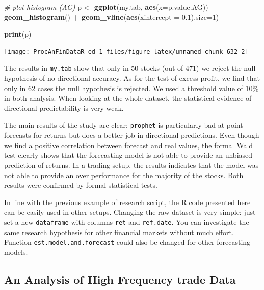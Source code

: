 \documentclass[11pt,]{book}
\newenvironment{Shaded}{\begin{snugshade}}{\end{snugshade}}
\newcommand{\KeywordTok}[1]{\textcolor[rgb]{0.27,0.27,0.27}{\textbf{#1}}}
\newcommand{\DataTypeTok}[1]{\textcolor[rgb]{0.27,0.27,0.27}{#1}}
\newcommand{\DecValTok}[1]{\textcolor[rgb]{0.06,0.06,0.06}{#1}}
\newcommand{\FloatTok}[1]{\textcolor[rgb]{0.06,0.06,0.06}{#1}}
\newcommand{\StringTok}[1]{\textcolor[rgb]{0.5,0.5,0.5}{#1}}
\newcommand{\CommentTok}[1]{\textcolor[rgb]{0.56,0.35,0.01}{\textit{#1}}}
\newcommand{\OperatorTok}[1]{\textcolor[rgb]{0.81,0.36,0.00}{\textbf{#1}}}
\newcommand{\NormalTok}[1]{#1}
\begin{document}
\begin{Shaded}
\begin{Highlighting}[]
\CommentTok{# plot histogram (AG)}
\NormalTok{p <-}\StringTok{ }\KeywordTok{ggplot}\NormalTok{(my.tab, }\KeywordTok{aes}\NormalTok{(}\DataTypeTok{x=}\NormalTok{p.value.AG)) }\OperatorTok{+}\StringTok{ }
\StringTok{    }\KeywordTok{geom_histogram}\NormalTok{() }\OperatorTok{+}\StringTok{ }
\StringTok{    }\KeywordTok{geom_vline}\NormalTok{(}\KeywordTok{aes}\NormalTok{(}\DataTypeTok{xintercept =}  \FloatTok{0.1}\NormalTok{),}\DataTypeTok{size=}\DecValTok{1}\NormalTok{)}

\KeywordTok{print}\NormalTok{(p)    }
\end{Highlighting}
\end{Shaded}

\begin{center}\texttt{[image: ProcAnFinDataR\_ed\_1\_files/figure-latex/unnamed-chunk-632-2]} \end{center}

The results in \texttt{my.tab} show that only in 50 stocks (out of 471)
we reject the null hypothesis of no directional accuracy. As for the
test of excess profit, we find that only in 62 cases the null hypothesis
is rejected. We used a threshold value of 10\% in both analysis. When
looking at the whole dataset, the statistical evidence of directional
predictability is very weak.

The main results of the study are clear: \texttt{prophet} is
particularly bad at point forecasts for returns but does a better job in
directional predictions. Even though we find a positive correlation
between forecast and real values, the formal Wald test clearly shows
that the forecasting model is not able to provide an unbiased prediction
of returns. In a trading setup, the results indicates that the model was
not able to provide an over performance for the majority of the stocks.
Both results were confirmed by formal statistical tests.

In line with the previous example of research script, the R code
presented here can be easily used in other setups. Changing the raw
dataset is very simple: just set a new \texttt{dataframe} with columns
\texttt{ret} and \texttt{ref.date}. You can investigate the same
research hypothesis for other financial markets without much effort.
Function \texttt{est.model.and.forecast} could also be changed for other
forecasting models.

\subsection{An Analysis of High Frequency trade
Data}\label{research-gethfdata}
\end{document}
